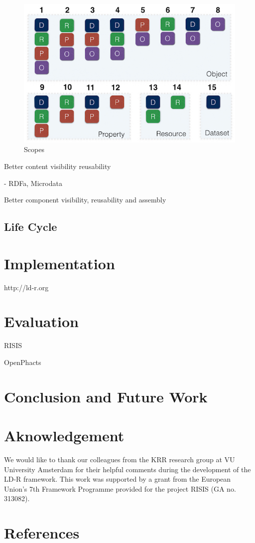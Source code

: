 \documentclass{acm_proc_article-sp}
\begin{document}
\begin{figure}
  \includegraphics[width=.9\linewidth]{images/scopes.jpg}
  \caption{Scopes}
\end{figure}

Better content visibility reusability

- RDFa, Microdata

Better component visibility, reusability and assembly


\subsection{Life Cycle}


\section{Implementation}

http://ld-r.org

\section{Evaluation}

RISIS

OpenPhacts

\section{Conclusion and Future Work}

\section{Aknowledgement}
We would like to thank our colleagues from the KRR research group at VU University Amsterdam for their helpful comments during the development of the LD-R framework. This work was supported by a grant from the European Union’s 7th Framework Programme provided for the project RISIS (GA no. 313082).

\section{References}
\end{document}
